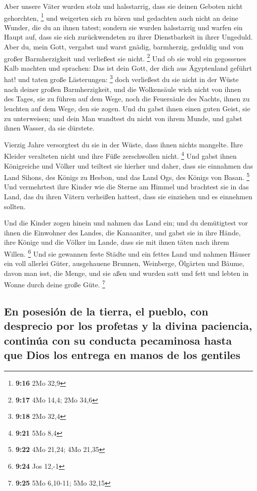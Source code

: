  Aber unsere Väter wurden stolz und halsstarrig, dass sie
deinen Geboten nicht gehorchten, \footnote{\textbf{9:16} 2Mo 32,9}
 und weigerten sich zu hören und gedachten auch nicht an
deine Wunder, die du an ihnen tatest; sondern sie wurden halsstarrig und
warfen ein Haupt auf, dass sie sich zurückwendeten zu ihrer
Dienstbarkeit in ihrer Ungeduld. Aber du, mein Gott, vergabst und warst
gnädig, barmherzig, geduldig und von großer Barmherzigkeit und
verließest sie nicht. \footnote{\textbf{9:17} 4Mo 14,4; 2Mo 34,6}
 Und ob sie wohl ein gegossenes Kalb machten und
sprachen: Das ist dein Gott, der dich aus Ägyptenland geführt hat! und
taten große Lästerungen: \footnote{\textbf{9:18} 2Mo 32,4}
 doch verließest du sie nicht in der Wüste nach deiner
großen Barmherzigkeit, und die Wolkensäule wich nicht von ihnen des
Tages, sie zu führen auf dem Wege, noch die Feuersäule des Nachts, ihnen
zu leuchten auf dem Wege, den sie zogen.  Und du gabst
ihnen einen guten Geist, sie zu unterweisen; und dein Man wandtest du
nicht von ihrem Munde, und gabst ihnen Wasser, da sie dürstete.

 Vierzig Jahre versorgtest du sie in der Wüste, dass
ihnen nichts mangelte. Ihre Kleider veralteten nicht und ihre Füße
zerschwollen nicht. \footnote{\textbf{9:21} 5Mo 8,4}  Und
gabst ihnen Königreiche und Völker und teiltest sie hierher und daher,
dass sie einnahmen das Land Sihons, des Königs zu Hesbon, und das Land
Ogs, des Königs von Basan. \footnote{\textbf{9:22} 4Mo 21,24; 4Mo 21,35}
 Und vermehrtest ihre Kinder wie die Sterne am Himmel und
brachtest sie in das Land, das du ihren Vätern verheißen hattest, dass
sie einziehen und es einnehmen sollten.

 Und die Kinder zogen hinein und nahmen das Land ein; und
du demütigtest vor ihnen die Einwohner des Landes, die Kanaaniter, und
gabst sie in ihre Hände, ihre Könige und die Völker im Lande, dass sie
mit ihnen täten nach ihrem Willen. \footnote{\textbf{9:24} Jos 12,-1}
 Und sie gewannen feste Städte und ein fettes Land und
nahmen Häuser ein voll allerlei Güter, ausgehauene Brunnen, Weinberge,
Ölgärten und Bäume, davon man isst, die Menge, und sie aßen und wurden
satt und fett und lebten in Wonne durch deine große Güte. \footnote{\textbf{9:25}
  5Mo 6,10-11; 5Mo 32,15}

\hypertarget{en-posesiuxf3n-de-la-tierra-el-pueblo-con-desprecio-por-los-profetas-y-la-divina-paciencia-continuxfaa-con-su-conducta-pecaminosa-hasta-que-dios-los-entrega-en-manos-de-los-gentiles}{%
\subsection{En posesión de la tierra, el pueblo, con desprecio por los
profetas y la divina paciencia, continúa con su conducta pecaminosa
hasta que Dios los entrega en manos de los
gentiles}\label{en-posesiuxf3n-de-la-tierra-el-pueblo-con-desprecio-por-los-profetas-y-la-divina-paciencia-continuxfaa-con-su-conducta-pecaminosa-hasta-que-dios-los-entrega-en-manos-de-los-gentiles}}

